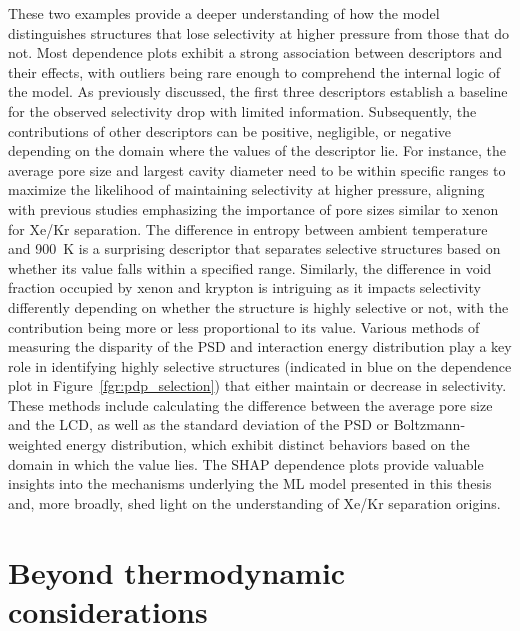 \documentclass[main]{subfiles}
\begin{document}
These two examples provide a deeper understanding of how the model distinguishes structures that lose selectivity at higher pressure from those that do not. Most dependence plots exhibit a strong association between descriptors and their effects, with outliers being rare enough to comprehend the internal logic of the model. As previously discussed, the first three descriptors establish a baseline for the observed selectivity drop with limited information. Subsequently, the contributions of other descriptors can be positive, negligible, or negative depending on the domain where the values of the descriptor lie. For instance, the average pore size and largest cavity diameter need to be within specific ranges to maximize the likelihood of maintaining selectivity at higher pressure, aligning with previous studies emphasizing the importance of pore sizes similar to xenon for Xe/Kr separation. The difference in entropy between ambient temperature and \SI{900}{\kelvin} is a surprising descriptor that separates selective structures based on whether its value falls within a specified range. Similarly, the difference in void fraction occupied by xenon and krypton is intriguing as it impacts selectivity differently depending on whether the structure is highly selective or not, with the contribution being more or less proportional to its value. Various methods of measuring the disparity of the PSD and interaction energy distribution play a key role in identifying highly selective structures (indicated in blue on the dependence plot in Figure~\ref{fgr:pdp_selection}) that either maintain or decrease in selectivity. These methods include calculating the difference between the average pore size and the LCD, as well as the standard deviation of the PSD or Boltzmann-weighted energy distribution, which exhibit distinct behaviors based on the domain in which the value lies. The SHAP dependence plots provide valuable insights into the mechanisms underlying the ML model presented in this thesis and, more broadly, shed light on the understanding of Xe/Kr separation origins.

\section{Beyond thermodynamic considerations}
\end{document}

